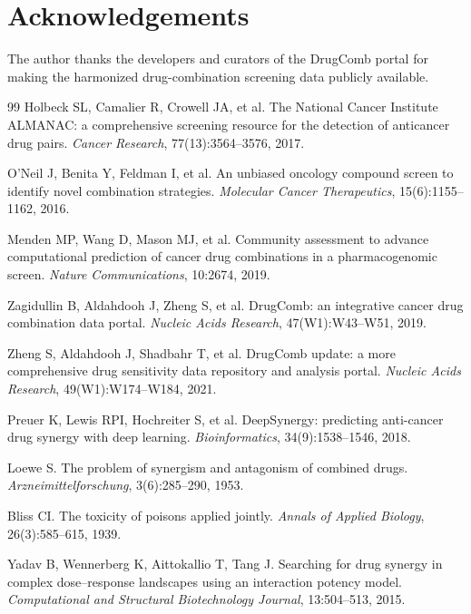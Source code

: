 \documentclass[11pt]{article}
\begin{document}
\section*{Acknowledgements}
The author thanks the developers and curators of the DrugComb portal for making the harmonized
drug-combination screening data publicly available.

\begin{thebibliography}{99}
\small
{} Holbeck SL, Camalier R, Crowell JA, et al.
The National Cancer Institute ALMANAC: a comprehensive screening resource for the detection of
anticancer drug pairs. \textit{Cancer Research}, 77(13):3564--3576, 2017.

 O'Neil J, Benita Y, Feldman I, et al.
An unbiased oncology compound screen to identify novel combination strategies.
\textit{Molecular Cancer Therapeutics}, 15(6):1155--1162, 2016.

 Menden MP, Wang D, Mason MJ, et al.
Community assessment to advance computational prediction of cancer drug combinations in a
pharmacogenomic screen. \textit{Nature Communications}, 10:2674, 2019.

 Zagidullin B, Aldahdooh J, Zheng S, et al.
DrugComb: an integrative cancer drug combination data portal.
\textit{Nucleic Acids Research}, 47(W1):W43--W51, 2019.

 Zheng S, Aldahdooh J, Shadbahr T, et al.
DrugComb update: a more comprehensive drug sensitivity data repository and analysis portal.
\textit{Nucleic Acids Research}, 49(W1):W174--W184, 2021.

 Preuer K, Lewis RPI, Hochreiter S, et al.
DeepSynergy: predicting anti-cancer drug synergy with deep learning.
\textit{Bioinformatics}, 34(9):1538--1546, 2018.

 Loewe S.
The problem of synergism and antagonism of combined drugs.
\textit{Arzneimittelforschung}, 3(6):285--290, 1953.

 Bliss CI.
The toxicity of poisons applied jointly.
\textit{Annals of Applied Biology}, 26(3):585--615, 1939.

 Yadav B, Wennerberg K, Aittokallio T, Tang J.
Searching for drug synergy in complex dose--response landscapes using an interaction potency model.
\textit{Computational and Structural Biotechnology Journal}, 13:504--513, 2015.


\end{thebibliography}
\end{document}
